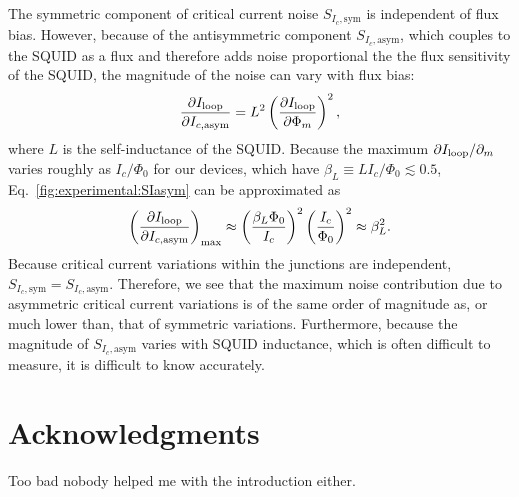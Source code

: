 The symmetric component of critical current noise $S_{I_c,\text{sym}}$ is independent of flux bias. However, because of the antisymmetric component $S_{I_c,\text{asym}}$, which couples to the SQUID as a flux and therefore adds noise proportional the the flux sensitivity of the SQUID, the magnitude of the noise can vary with flux bias:
\begin{align}\label{fig:experimental:SIasym}
\frac{\partial\Iloop}{\partial I_{c,\text{asym}}} = L^2 %
\left(\frac{\partial \Iloop}{\partial \Phi_m}\right)^2,
\end{align}
where $L$ is the self-inductance of the SQUID. Because the maximum $\partial I_\text{loop}/\partial_m$ varies roughly as $I_c/\Phi_0$ for our devices, which have $\beta_L \equiv LI_c/\Phi_0 \lesssim 0.5$, Eq.~\eqref{fig:experimental:SIasym} can be approximated as
\begin{align}\label{fig:experimental:SIasym}
\left(\frac{\partial\Iloop}{\partial I_{c,\text{asym}}}\right)_{\text{max}} \approx %
\left(\frac{\beta_L\Phi_0}{I_c}\right)^2 %
\left(\frac{I_c}{\Phi_0}\right)^2 %
\approx \beta_L^2.
\end{align}
Because critical current variations within the junctions are independent, $S_{I_c,\text{sym}} = S_{I_c,\text{asym}}$. Therefore, we see that the maximum noise contribution due to asymmetric critical current variations is of the same order of magnitude as, or much lower than, that of symmetric variations. Furthermore, because the magnitude of $S_{I_c,\text{asym}}$ varies with SQUID inductance, which is often difficult to measure, it is difficult to know accurately.

\section*{Acknowledgments}

Too bad nobody helped me with the introduction either.
